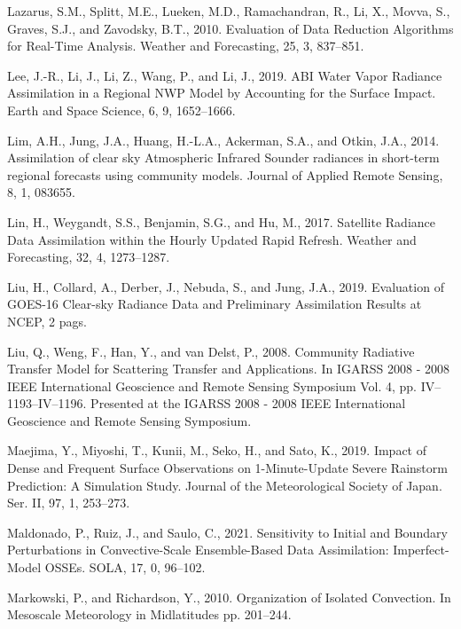 \documentclass[12pt,oneside,a4paper]{reedthesis}
\begin{document}
\leavevmode\hypertarget{ref-lazarus2010}{}%
Lazarus, S.M., Splitt, M.E., Lueken, M.D., Ramachandran, R., Li, X., Movva, S., Graves, S.J., and Zavodsky, B.T., 2010. Evaluation of Data Reduction Algorithms for Real-Time Analysis. Weather and Forecasting, 25, 3, 837--851.

\leavevmode\hypertarget{ref-lee2019}{}%
Lee, J.-R., Li, J., Li, Z., Wang, P., and Li, J., 2019. ABI Water Vapor Radiance Assimilation in a Regional NWP Model by Accounting for the Surface Impact. Earth and Space Science, 6, 9, 1652--1666.

\leavevmode\hypertarget{ref-lim2014}{}%
Lim, A.H., Jung, J.A., Huang, H.-L.A., Ackerman, S.A., and Otkin, J.A., 2014. Assimilation of clear sky Atmospheric Infrared Sounder radiances in short-term regional forecasts using community models. Journal of Applied Remote Sensing, 8, 1, 083655.

\leavevmode\hypertarget{ref-lin2017a}{}%
Lin, H., Weygandt, S.S., Benjamin, S.G., and Hu, M., 2017. Satellite Radiance Data Assimilation within the Hourly Updated Rapid Refresh. Weather and Forecasting, 32, 4, 1273--1287.

\leavevmode\hypertarget{ref-liu2019}{}%
Liu, H., Collard, A., Derber, J., Nebuda, S., and Jung, J.A., 2019. Evaluation of GOES-16 Clear-sky Radiance Data and Preliminary Assimilation Results at NCEP, 2 pags.

\leavevmode\hypertarget{ref-liu2008}{}%
Liu, Q., Weng, F., Han, Y., and van Delst, P., 2008. Community Radiative Transfer Model for Scattering Transfer and Applications. In IGARSS 2008 - 2008 IEEE International Geoscience and Remote Sensing Symposium Vol. 4, pp. IV--1193--IV--1196. Presented at the IGARSS 2008 - 2008 IEEE International Geoscience and Remote Sensing Symposium.

\leavevmode\hypertarget{ref-maejima2019}{}%
Maejima, Y., Miyoshi, T., Kunii, M., Seko, H., and Sato, K., 2019. Impact of Dense and Frequent Surface Observations on 1-Minute-Update Severe Rainstorm Prediction: A Simulation Study. Journal of the Meteorological Society of Japan. Ser. II, 97, 1, 253--273.

\leavevmode\hypertarget{ref-maldonado2021}{}%
Maldonado, P., Ruiz, J., and Saulo, C., 2021. Sensitivity to Initial and Boundary Perturbations in Convective-Scale Ensemble-Based Data Assimilation: Imperfect-Model OSSEs. SOLA, 17, 0, 96--102.

\leavevmode\hypertarget{ref-markowski2010}{}%
Markowski, P., and Richardson, Y., 2010. Organization of Isolated Convection. In Mesoscale Meteorology in Midlatitudes pp. 201--244.
\end{document}
